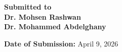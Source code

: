 \begin{titlepage}
\vspace{2cm}

\begin{center}
    {\Large \textbf{Submitted to}} \\[6pt]
    {\Large \textbf{Dr. Mohsen Rashwan}}\\[0.3cm]
    {\Large \textbf{Dr. Mohammed Abdelghany}}\\[1cm]
\end{center}

\vfill

\begin{center}
    {\large \textbf{Date of Submission:} ِApril 9, 2026}
\end{center}

\end{titlepage}